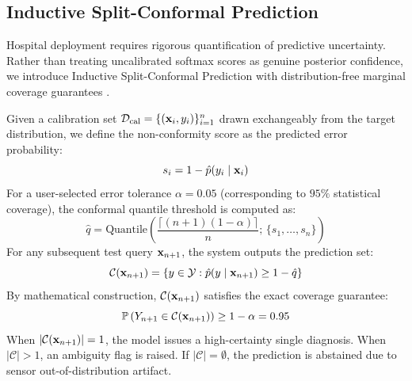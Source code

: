 \subsection{Inductive Split-Conformal Prediction}
Hospital deployment requires rigorous quantification of predictive uncertainty. Rather than treating uncalibrated softmax scores as genuine posterior confidence, we introduce Inductive Split-Conformal Prediction with distribution-free marginal coverage guarantees \cite{Angelopoulos2021}.

Given a calibration set $\mathcal{D}_{\text{cal}} = \{(\mathbf{x}_i, y_i)\}_{i=1}^n$ drawn exchangeably from the target distribution, we define the non-conformity score as the predicted error probability:
\begin{equation}
    s_i = 1 - \hat{p}(y_i \mid \mathbf{x}_i)
\end{equation}
For a user-selected error tolerance $\alpha = 0.05$ (corresponding to $95\%$ statistical coverage), the conformal quantile threshold is computed as:
\begin{equation}
    \hat{q} = \text{Quantile}\left( \frac{\lceil (n+1)(1-\alpha) \rceil}{n} ; \, \{s_1, \dots, s_n\} \right)
\end{equation}
For any subsequent test query $\mathbf{x}_{n+1}$, the system outputs the prediction set:
\begin{equation}
    \mathcal{C}(\mathbf{x}_{n+1}) = \left\{ y \in \mathcal{Y} : \hat{p}(y \mid \mathbf{x}_{n+1}) \ge 1 - \hat{q} \right\}
\end{equation}
By mathematical construction, $\mathcal{C}(\mathbf{x}_{n+1})$ satisfies the exact coverage guarantee:
\begin{equation}
    \mathbb{P}\left( Y_{n+1} \in \mathcal{C}(\mathbf{x}_{n+1}) \right) \ge 1 - \alpha = 0.95
\end{equation}
When $|\mathcal{C}(\mathbf{x}_{n+1})| = 1$, the model issues a high-certainty single diagnosis. When $|\mathcal{C}| > 1$, an ambiguity flag is raised. If $|\mathcal{C}| = \emptyset$, the prediction is abstained due to sensor out-of-distribution artifact.
